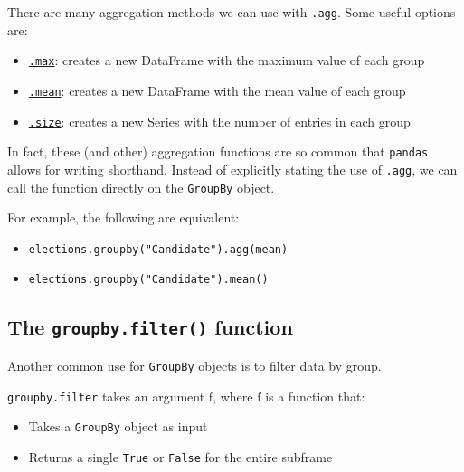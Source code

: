 \documentclass[
  letterpaper,
  DIV=11,
  numbers=noendperiod]{scrreprt}
\providecommand{\tightlist}{%
  \setlength{\itemsep}{0pt}\setlength{\parskip}{0pt}}\usepackage{longtable,booktabs,array}
\begin{document}
There are many aggregation methods we can use with \texttt{.agg}. Some
useful options are:

\begin{itemize}
\tightlist
\item
  \href{https://pandas.pydata.org/pandas-docs/stable/reference/api/pandas.core.groupby.GroupBy.max.html}{\texttt{.max}}:
  creates a new DataFrame with the maximum value of each group
\item
  \href{https://pandas.pydata.org/pandas-docs/stable/reference/api/pandas.core.groupby.GroupBy.mean.html}{\texttt{.mean}}:
  creates a new DataFrame with the mean value of each group
\item
  \href{https://pandas.pydata.org/pandas-docs/stable/reference/api/pandas.core.groupby.GroupBy.size.html}{\texttt{.size}}:
  creates a new Series with the number of entries in each group
\end{itemize}

In fact, these (and other) aggregation functions are so common that
\texttt{pandas} allows for writing shorthand. Instead of explicitly
stating the use of \texttt{.agg}, we can call the function directly on
the \texttt{GroupBy} object.

For example, the following are equivalent:

\begin{itemize}
\tightlist
\item
  \texttt{elections.groupby("Candidate").agg(mean)}
\item
  \texttt{elections.groupby("Candidate").mean()}
\end{itemize}

\hypertarget{the-groupby.filter-function}{%
\subsection{\texorpdfstring{The \texttt{groupby.filter()}
function}{The groupby.filter() function}}\label{the-groupby.filter-function}}

Another common use for \texttt{GroupBy} objects is to filter data by
group.

\texttt{groupby.filter} takes an argument \(\text{f}\), where
\(\text{f}\) is a function that:

\begin{itemize}
\tightlist
\item
  Takes a \texttt{GroupBy} object as input
\item
  Returns a single \texttt{True} or \texttt{False} for the entire
  subframe
\end{itemize}
\end{document}
